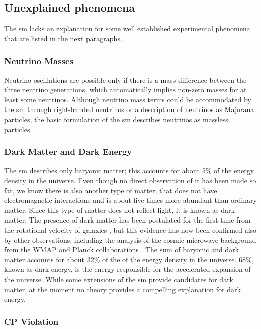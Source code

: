 \subsection{Unexplained phenomena}
\label{sec:sm:missingpieces}

The \gls{sm} lacks an explanation for some well established experimental phenomena that are listed in the next paragraphs.

\subsubsection*{Neutrino Masses}

Neutrino oscillations \cite{PhysRevLett.81.1562} are possible only if there is a mass difference between the three neutrino generations, which automatically implies non-zero masses for at least some neutrinos. Although neutrino mass terms could be accommodated by the \gls{sm} through right-handed neutrinos or a description of neutrinos as Majorana particles, the basic formulation of the \gls{sm} describes neutrinos as massless particles.

\subsubsection*{Dark Matter and Dark Energy}

The \gls{sm} describes only baryonic matter; this accounts for about 5\% of the energy density in the universe. Even though no direct observation of it has been made so far, we know there is also another type of matter, that does not have electromagnetic interactions and  is about five times more abundant than ordinary matter.  Since this type of matter does not reflect light, it is known as dark matter. The presence of dark matter has been postulated for the first time from the rotational velocity of galaxies \cite{Zwicky:1937zza}, but this evidence has now been confirmed also by other observations, including the analysis of the cosmic microwave background from the WMAP and Planck collaborations \cite{Larson:2010gs,Ade:2013zuv}. The sum of baryonic and dark matter accounts for about 32\% of the of the energy density in the universe. 68\%, known as dark energy, is the energy responsible for the accelerated expansion of the universe. While some extensions of the \gls{sm} provide candidates for dark matter, at the moment no theory provides a compelling explanation for dark energy.


\subsubsection*{CP Violation}

